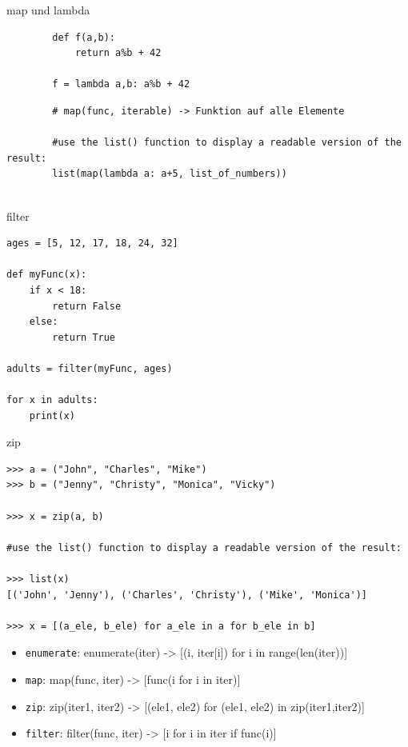 \begin{frame}[fragile]{map und lambda}
	\begin{lstlisting}
		def f(a,b):
			return a%b + 42
		
		f = lambda a,b: a%b + 42
	\end{lstlisting}
	\pause 
	\begin{lstlisting}
		# map(func, iterable) -> Funktion auf alle Elemente
		
		#use the list() function to display a readable version of the result:
		list(map(lambda a: a+5, list_of_numbers))
		
	\end{lstlisting}
\end{frame}

\begin{frame}[fragile]{filter}
	\begin{lstlisting}
ages = [5, 12, 17, 18, 24, 32]

def myFunc(x):
	if x < 18:
		return False
	else:
		return True

adults = filter(myFunc, ages)

for x in adults:
	print(x) 
	\end{lstlisting}
\end{frame}

\begin{frame}[fragile]{zip}
	\begin{lstlisting}
>>> a = ("John", "Charles", "Mike")
>>> b = ("Jenny", "Christy", "Monica", "Vicky")

>>> x = zip(a, b)

#use the list() function to display a readable version of the result:

>>> list(x)
[('John', 'Jenny'), ('Charles', 'Christy'), ('Mike', 'Monica')]

>>> x = [(a_ele, b_ele) for a_ele in a for b_ele in b]

	\end{lstlisting}
\end{frame}

\begin{frame}
	\begin{itemize}
		\item \texttt{enumerate}: enumerate(iter) -> [(i, iter[i]) for i in range(len(iter))]
		\item \texttt{map}: map(func, iter) -> [func(i for i in iter)]
		\item \texttt{zip}: zip(iter1, iter2) -> [(ele1, ele2) for (ele1, ele2) in zip(iter1,iter2)]
		\item \texttt{filter}: filter(func, iter) -> [i for i in iter if func(i)]
	\end{itemize}
\end{frame}

